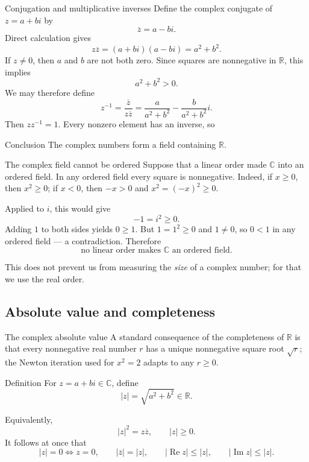 \documentclass[aspectratio=169,11pt]{beamer}
\newcommand{\R}{\mathbb R}
\newcommand{\C}{\mathbb C}
\begin{document}
\begin{frame}{Conjugation and multiplicative inverses}
  Define the \alert{complex conjugate} of \(z=a+bi\) by
  \[
    \overline z=a-bi.
  \]
  Direct calculation gives
  \[
    z\overline z=(a+bi)(a-bi)=a^2+b^2.
  \]
  If \(z\ne0\), then \(a\) and \(b\) are not both zero.  Since squares are
  nonnegative in \(\R\), this implies
  \[
    a^2+b^2>0.
  \]
  We may therefore define
  \[
    \boxed{z^{-1}=\frac{\overline z}{z\overline z}
      =\frac{a}{a^2+b^2}-\frac{b}{a^2+b^2}i.}
  \]
  Then \(zz^{-1}=1\).  Every nonzero element has an inverse, so
  \begin{alertblock}{Conclusion}
    The complex numbers form a field containing \(\R\).
  \end{alertblock}
\end{frame}

\begin{frame}{The complex field cannot be ordered}
  Suppose that a linear order made \(\C\) into an ordered field.  In any
  ordered field every square is nonnegative.  Indeed, if \(x\ge0\), then
  \(x^2\ge0\); if \(x<0\), then \(-x>0\) and \(x^2=(-x)^2\ge0\).

  Applied to \(i\), this would give
  \[
    -1=i^2\ge0.
  \]
  Adding \(1\) to both sides yields \(0\ge1\).  But \(1=1^2\ge0\) and
  \(1\ne0\), so \(0<1\) in any ordered field --- a contradiction.  Therefore
  \[
    \boxed{\text{no linear order makes \(\C\) an ordered field}.}
  \]

  This does not prevent us from measuring the \emph{size} of a complex
  number; for that we use the real order.
\end{frame}

\subsection{Absolute value and completeness}

\begin{frame}{The complex absolute value}
  A standard consequence of the completeness of \(\R\) is that every
  nonnegative real number \(r\) has a unique nonnegative square root
  \(\sqrt r\); the Newton iteration used for \(x^2=2\) adapts to any
  \(r\ge0\).

  \begin{block}{Definition}
    For \(z=a+bi\in\C\), define
    \[
      \boxed{|z|=\sqrt{a^2+b^2} \in\R.}
    \]
  \end{block}
  Equivalently,
  \[
    |z|^2=z\overline z,
    \qquad
    |z|\ge0.
  \]
  It follows at once that
  \[
    |z|=0\Longleftrightarrow z=0,
    \qquad
    |\overline z|=|z|,
    \qquad
    |\operatorname{Re}z|\le|z|,
    \qquad
    |\operatorname{Im}z|\le|z|.
  \]
\end{frame}
\end{document}
